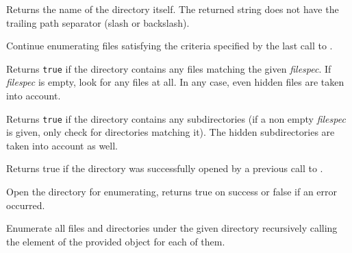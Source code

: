 \label{wxdirgetname}


Returns the name of the directory itself. The returned string does not have the
trailing path separator (slash or backslash).


\label{wxdirgetnext}


Continue enumerating files satisfying the criteria specified by the last call
to .


\label{wxdirhasfiles}


Returns {\tt true} if the directory contains any files matching the given 
{\it filespec}. If {\it filespec} is empty, look for any files at all. In any
case, even hidden files are taken into account.


\label{wxdirhassubdirs}


Returns {\tt true} if the directory contains any subdirectories (if a non
empty {\it filespec} is given, only check for directories matching it).
The hidden subdirectories are taken into account as well.


\label{wxdirisopened}


Returns true if the directory was successfully opened by a previous call to 
.


\label{wxdiropen}


Open the directory for enumerating, returns true on success or false if an
error occurred.


\label{wxdirtraverse}


Enumerate all files and directories under the given directory recursively
calling the element of the provided  
object for each of them.

